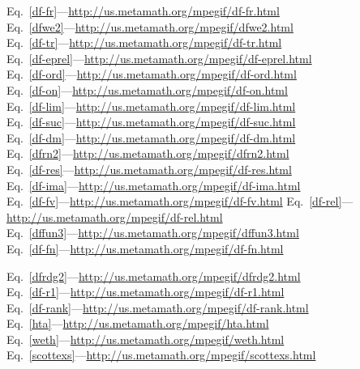 \documentclass{slides}
\begin{document}
\begin{slide}

Eq.~\ref{df-fr}---\url{http://us.metamath.org/mpegif/df-fr.html} \\
Eq.~\ref{dfwe2}---\url{http://us.metamath.org/mpegif/dfwe2.html} \\
Eq.~\ref{df-tr}---\url{http://us.metamath.org/mpegif/df-tr.html} \\
Eq.~\ref{df-eprel}---\url{http://us.metamath.org/mpegif/df-eprel.html} \\
Eq.~\ref{df-ord}---\url{http://us.metamath.org/mpegif/df-ord.html} \\
Eq.~\ref{df-on}---\url{http://us.metamath.org/mpegif/df-on.html} \\
Eq.~\ref{df-lim}---\url{http://us.metamath.org/mpegif/df-lim.html} \\
Eq.~\ref{df-suc}---\url{http://us.metamath.org/mpegif/df-suc.html} \\
Eq.~\ref{df-dm}---\url{http://us.metamath.org/mpegif/df-dm.html} \\
Eq.~\ref{dfrn2}---\url{http://us.metamath.org/mpegif/dfrn2.html} \\
Eq.~\ref{df-res}---\url{http://us.metamath.org/mpegif/df-res.html} \\
Eq.~\ref{df-ima}---\url{http://us.metamath.org/mpegif/df-ima.html} \\
Eq.~\ref{df-fv}---\url{http://us.metamath.org/mpegif/df-fv.html}
Eq.~\ref{df-rel}---\url{http://us.metamath.org/mpegif/df-rel.html} \\
Eq.~\ref{dffun3}---\url{http://us.metamath.org/mpegif/dffun3.html} \\
Eq.~\ref{df-fn}---\url{http://us.metamath.org/mpegif/df-fn.html} \\

\end{slide}

\begin{slide}

Eq.~\ref{dfrdg2}---\url{http://us.metamath.org/mpegif/dfrdg2.html} \\
Eq.~\ref{df-r1}---\url{http://us.metamath.org/mpegif/df-r1.html} \\
Eq.~\ref{df-rank}---\url{http://us.metamath.org/mpegif/df-rank.html} \\
Eq.~\ref{hta}---\url{http://us.metamath.org/mpegif/hta.html} \\
Eq.~\ref{weth}---\url{http://us.metamath.org/mpegif/weth.html}           \\
Eq.~\ref{scottexs}---\url{http://us.metamath.org/mpegif/scottexs.html}


\end{slide}
\end{document}
